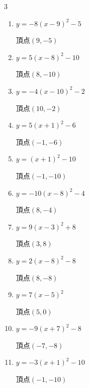 \begin{multicols}{3}
\begin{enumerate}
        $\displaystyle 頂点\left( 3 , -2 \right)$

  \item $\displaystyle y=-8\left( x-9\right)^{2}-5$

        $\displaystyle 頂点\left( 9 , -5 \right)$

  \item $\displaystyle y=5\left( x-8\right)^{2}-10$

        $\displaystyle 頂点\left( 8 , -10 \right)$

  \item $\displaystyle y=-4\left( x-10\right)^{2}-2$

        $\displaystyle 頂点\left( 10 , -2 \right)$

  \item $\displaystyle y=5\left( x+1\right)^{2}-6$

        $\displaystyle 頂点\left( -1 , -6 \right)$

  \item $\displaystyle y=\left( x+1\right)^{2}-10$

        $\displaystyle 頂点\left( -1 , -10 \right)$

  \item $\displaystyle y=-10\left( x-8\right)^{2}-4$

        $\displaystyle 頂点\left( 8 , -4 \right)$

  \item $\displaystyle y=9\left( x-3\right)^{2}+8$

        $\displaystyle 頂点\left( 3 , 8 \right)$

  \item $\displaystyle y=2\left( x-8\right)^{2}-8$

        $\displaystyle 頂点\left( 8 , -8 \right)$

  \item $\displaystyle y=7\left( x-5\right)^{2}$

        $\displaystyle 頂点\left( 5 , 0 \right)$

\columnbreak %

  \item $\displaystyle y=-9\left( x+7\right)^{2}-8$

        $\displaystyle 頂点\left( -7 , -8 \right)$

  \item $\displaystyle y=-3\left( x+1\right)^{2}-10$

        $\displaystyle 頂点\left( -1 , -10 \right)$


\end{enumerate}
\end{multicols}
